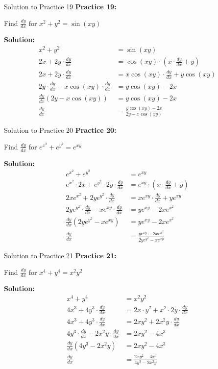 \documentclass[aspectratio=169]{beamer}
\begin{document}
\begin{frame}{Solution to Practice 19}
\textbf{Practice 19:}

Find $\frac{dy}{dx}$ for $x^2 + y^2 = \sin(xy)$

\textbf{Solution:}
\[
\begin{aligned}
  x^2 + y^2 &= \sin(xy) \\
  2x + 2y \cdot \frac{dy}{dx} &= \cos(xy) \cdot (x \cdot \frac{dy}{dx} + y) \\
  2x + 2y \cdot \frac{dy}{dx} &= x\cos(xy) \cdot \frac{dy}{dx} + y\cos(xy) \\
  2y \cdot \frac{dy}{dx} - x\cos(xy) \cdot \frac{dy}{dx} &= y\cos(xy) - 2x \\
  \frac{dy}{dx}(2y - x\cos(xy)) &= y\cos(xy) - 2x \\
  \frac{dy}{dx} &= \frac{y\cos(xy) - 2x}{2y - x\cos(xy)}
\end{aligned}
\]
\end{frame}

\begin{frame}{Solution to Practice 20}
\textbf{Practice 20:}

Find $\frac{dy}{dx}$ for $e^{x^2} + e^{y^2} = e^{xy}$

\textbf{Solution:}
\[
\begin{aligned}
  e^{x^2} + e^{y^2} &= e^{xy} \\
  e^{x^2} \cdot 2x + e^{y^2} \cdot 2y \cdot \frac{dy}{dx} &= e^{xy} \cdot (x \cdot \frac{dy}{dx} + y) \\
  2xe^{x^2} + 2ye^{y^2} \cdot \frac{dy}{dx} &= xe^{xy} \cdot \frac{dy}{dx} + ye^{xy} \\
  2ye^{y^2} \cdot \frac{dy}{dx} - xe^{xy} \cdot \frac{dy}{dx} &= ye^{xy} - 2xe^{x^2} \\
  \frac{dy}{dx}(2ye^{y^2} - xe^{xy}) &= ye^{xy} - 2xe^{x^2} \\
  \frac{dy}{dx} &= \frac{ye^{xy} - 2xe^{x^2}}{2ye^{y^2} - xe^{xy}}
\end{aligned}
\]
\end{frame}

\begin{frame}{Solution to Practice 21}
\textbf{Practice 21:}

Find $\frac{dy}{dx}$ for $x^4 + y^4 = x^2y^2$

\textbf{Solution:}
\[
\begin{aligned}
  x^4 + y^4 &= x^2y^2 \\
  4x^3 + 4y^3 \cdot \frac{dy}{dx} &= 2x \cdot y^2 + x^2 \cdot 2y \cdot \frac{dy}{dx} \\
  4x^3 + 4y^3 \cdot \frac{dy}{dx} &= 2xy^2 + 2x^2y \cdot \frac{dy}{dx} \\
  4y^3 \cdot \frac{dy}{dx} - 2x^2y \cdot \frac{dy}{dx} &= 2xy^2 - 4x^3 \\
  \frac{dy}{dx}(4y^3 - 2x^2y) &= 2xy^2 - 4x^3 \\
  \frac{dy}{dx} &= \frac{2xy^2 - 4x^3}{4y^3 - 2x^2y}
\end{aligned}
\]
\end{frame}
\end{document}

